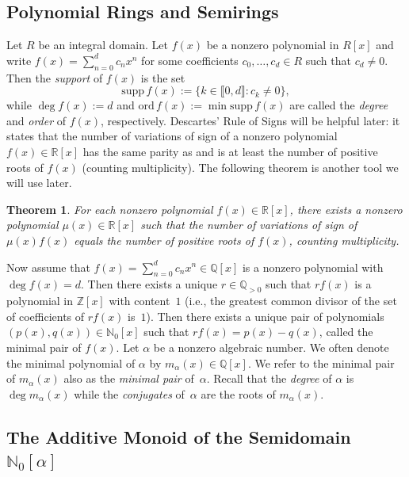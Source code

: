 \documentclass[11pt]{amsart}
\newtheorem{theorem}{Theorem}[section]
\theoremstyle{definition}
\theoremstyle{remark}
\numberwithin{equation}{section}
\newcommand{\nn}{\mathbb{N}}
\newcommand{\qq}{\mathbb{Q}}
\newcommand{\rr}{\mathbb{R}}
\newcommand{\zz}{\mathbb{Z}}
\providecommand\ldb{\llbracket}
\providecommand\rdb{\rrbracket}
\begin{document}
\medskip

\subsection{Polynomial Rings and Semirings}

Let $R$ be an integral domain. Let $f(x)$ be a nonzero polynomial in $R[x]$ and write $f(x) = \sum_{n=0}^d c_n x^n$ for some coefficients $c_0, \dots, c_d \in R$ such that $c_d \neq 0$. Then the \emph{support} of $f(x)$ is the set
\[
	\text{supp} \, f(x) := \{k \in \ldb 0,d \rdb : c_k \neq 0\},
\]
while $\deg f(x) := d$ and $\text{ord} \, f(x) := \min \text{supp} \, f(x)$ are called the \emph{degree} and \emph{order} of $f(x)$, respectively. Descartes' Rule of Signs will be helpful later: it states that the number of variations of sign of a nonzero polynomial $f(x) \in \rr[x]$ has the same parity as and is at least the number of positive roots of $f(x)$ (counting multiplicity). The following theorem is another tool we will use later.

\begin{theorem} \cite[Section~5]{dC18} \label{thm:Curtiss' result}  
	For each nonzero polynomial $f(x) \in \rr[x]$, there exists a nonzero polynomial $\mu(x) \in \rr[x]$ such that the number of variations of sign of $\mu(x)f(x)$ equals the number of positive roots of $f(x)$, counting multiplicity.
\end{theorem}

Now assume that $f(x) = \sum_{n=0}^d c_n x^n \in \qq[x]$ is a nonzero polynomial with $\deg f(x) = d$. Then there exists a unique $r \in \qq_{> 0}$ such that $r f(x)$ is a polynomial in $\zz[x]$ with content~$1$ (i.e., the greatest common divisor of the set of coefficients of $rf(x)$ is~$1$). Then there exists a unique pair of polynomials $(p(x),q(x)) \in \nn_0[x]$ such that $rf(x) = p(x) - q(x)$, called the minimal pair of $f(x)$. Let $\alpha$ be a nonzero algebraic number. We often denote the minimal polynomial of $\alpha$ by $m_\alpha(x) \in \qq[x]$. We refer to the minimal pair of $m_\alpha(x)$ also as the \emph{minimal pair} of~$\alpha$. Recall that the \emph{degree} of $\alpha$ is $\deg m_\alpha(x)$ while the \emph{conjugates} of~$\alpha$ are the roots of $m_\alpha(x)$.


\medskip

\subsection{The Additive Monoid of the Semidomain $\nn_0[\alpha]$}
\end{document}
